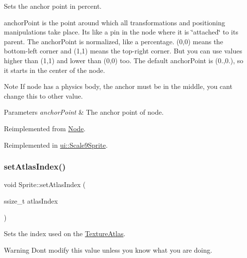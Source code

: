 Sets the anchor point in percent.

anchor\+Point is the point around which all transformations and positioning manipulations take place. It\textquotesingle{}s like a pin in the node where it is \char`\"{}attached\char`\"{} to its parent. The anchor\+Point is normalized, like a percentage. (0,0) means the bottom-\/left corner and (1,1) means the top-\/right corner. But you can use values higher than (1,1) and lower than (0,0) too. The default anchor\+Point is (0.,0.), so it starts in the center of the node. \begin{DoxyNote}{Note}
If node has a physics body, the anchor must be in the middle, you can\textquotesingle{}t change this to other value.
\end{DoxyNote}

\begin{DoxyParams}{Parameters}
{\em anchor\+Point} & The anchor point of node. \\
\hline
\end{DoxyParams}


Reimplemented from \hyperlink{classNode_a4dd45cb48a51df7c257675f527e3f277}{Node}.



Reimplemented in \hyperlink{classui_1_1Scale9Sprite_a7153fb170a630efc0748e0db6678963f}{ui\+::\+Scale9\+Sprite}.

\mbox{\label{classSprite_aa3455e2c6a468008225d04e744d626f9}} 
\subsubsection{\texorpdfstring{set\+Atlas\+Index()}{setAtlasIndex()}\hspace{0.1cm}{\footnotesize\ttfamily [1/2]}}
{\footnotesize\ttfamily void Sprite\+::set\+Atlas\+Index (\begin{DoxyParamCaption}\item[{ssize\+\_\+t}]{atlas\+Index }\end{DoxyParamCaption})\hspace{0.3cm}{\ttfamily [inline]}}

Sets the index used on the \hyperlink{classTextureAtlas}{Texture\+Atlas}.

\begin{DoxyWarning}{Warning}
Don\textquotesingle{}t modify this value unless you know what you are doing. 
\end{DoxyWarning}
\mbox{\label{classSprite_aa3455e2c6a468008225d04e744d626f9}} 
